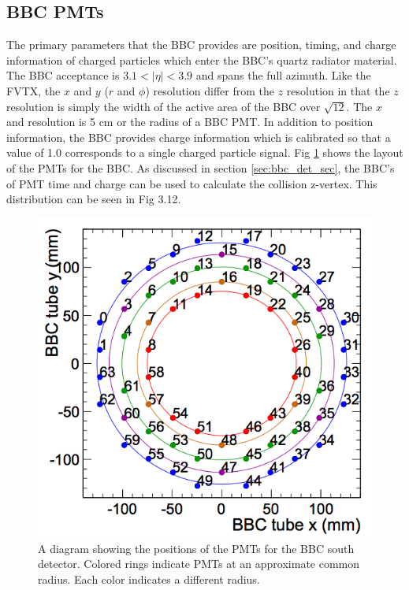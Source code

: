 \subsection{BBC PMTs}
The primary parameters that the BBC provides are position, timing, and charge information of charged particles which enter the BBC's quartz radiator material. The BBC acceptance is $3.1 < |\eta| < 3.9$ and spans the full azimuth. Like the FVTX, the $x$ and $y$ ($r$ and $\phi$) resolution differ from the $z$ resolution in that the $z$ resolution is simply the width of the active area of the BBC over $\sqrt{12}$. The $x$ and resolution is 5 cm or the radius of a BBC PMT. In addition to position information, the BBC provides charge information which is calibrated so that a value of 1.0 corresponds to a single charged particle signal. Fig \ref{fig:bbc_rings} shows the layout of the PMTs for the BBC. As discussed in section \ref{sec:bbc_det_sec}, the BBC's of PMT time and charge can be used to calculate the collision z-vertex. This distribution can be seen in Fig 3.12. 
\begin{figure}[h!]
\begin{center}
\includegraphics[width=0.55\linewidth]{figs/bbc_rings.png}
\caption{A diagram showing the positions of the PMTs for the BBC south detector. Colored rings indicate PMTs at an approximate common radius. Each color indicates a different radius.}
\label{fig:bbc_rings}
\end{center}
\end{figure}




